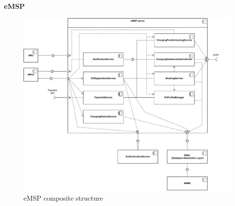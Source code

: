 \textbf{eMSP}\\
\begin{figure}[H]
    \centering
    \includegraphics[width=1\textwidth]{Images/cp2/eMSP_server.pdf}
    \caption{eMSP composite structure}
\end{figure}

